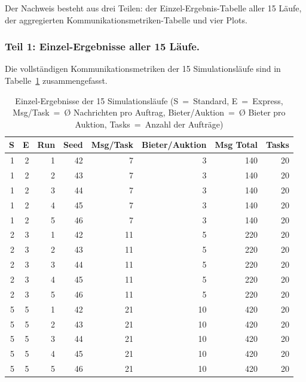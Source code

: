 Der Nachweis besteht aus drei Teilen: der Einzel-Ergebnis-Tabelle aller 15 Läufe, der aggregierten Kommunikationsmetriken-Tabelle und vier Plots.

\subsubsection{Teil 1: Einzel-Ergebnisse aller 15 Läufe.}
Die vollständigen Kommunikationsmetriken der 15 Simulationsläufe sind in Tabelle~\ref{tab:raw_5c} zusammengefasst.

\begin{table}[H]
    \centering
    \small
    \begin{tabular}{r r r r r r r r}
        \toprule
        \textbf{S} & \textbf{E} & \textbf{Run} & \textbf{Seed} & \textbf{Msg/Task} & \textbf{Bieter/Auktion} & \textbf{Msg Total} & \textbf{Tasks} \\
        \midrule
        1 & 2 & 1 & 42 & 7  & 3  & 140 & 20 \\
        1 & 2 & 2 & 43 & 7  & 3  & 140 & 20 \\
        1 & 2 & 3 & 44 & 7  & 3  & 140 & 20 \\
        1 & 2 & 4 & 45 & 7  & 3  & 140 & 20 \\
        1 & 2 & 5 & 46 & 7  & 3  & 140 & 20 \\
        \midrule
        2 & 3 & 1 & 42 & 11 & 5  & 220 & 20 \\
        2 & 3 & 2 & 43 & 11 & 5  & 220 & 20 \\
        2 & 3 & 3 & 44 & 11 & 5  & 220 & 20 \\
        2 & 3 & 4 & 45 & 11 & 5  & 220 & 20 \\
        2 & 3 & 5 & 46 & 11 & 5  & 220 & 20 \\
        \midrule
        5 & 5 & 1 & 42 & 21 & 10 & 420 & 20 \\
        5 & 5 & 2 & 43 & 21 & 10 & 420 & 20 \\
        5 & 5 & 3 & 44 & 21 & 10 & 420 & 20 \\
        5 & 5 & 4 & 45 & 21 & 10 & 420 & 20 \\
        5 & 5 & 5 & 46 & 21 & 10 & 420 & 20 \\
        \bottomrule
    \end{tabular}
    \caption{Einzel-Ergebnisse der 15 Simulationsläufe (S~=~Standard, E~=~Express, Msg/Task~=~Ø Nachrichten pro Auftrag, Bieter/Auktion~=~Ø Bieter pro Auktion, Tasks~=~Anzahl der Aufträge)}
    \label{tab:raw_5c}
\end{table}

